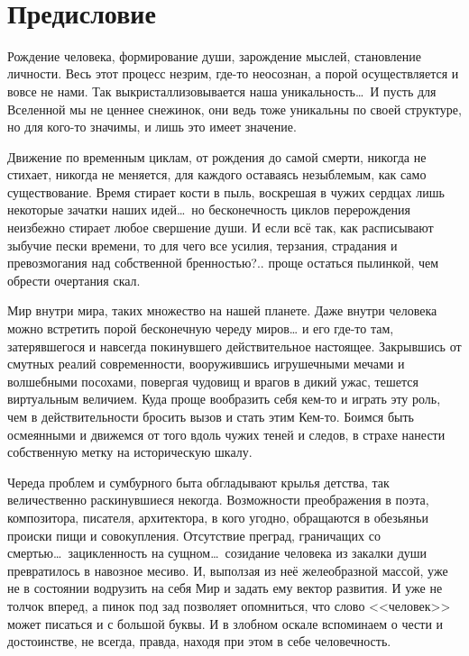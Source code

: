 \thispagestyle{empty}
~\\
\section*{Предисловие}

Рождение человека, формирование души, зарождение мыслей, становление личности. 
Весь этот процесс незрим, где-то неосознан, а порой осуществляется и вовсе не 
нами. Так выкристаллизовывается наша уникальность\dots\ И пусть для Вселенной 
мы не ценнее снежинок, они ведь тоже уникальны по своей структуре, но для 
кого-то значимы, и лишь это имеет значение.

Движение по временным циклам, от рождения до самой смерти, никогда не стихает, никогда не меняется, для каждого оставаясь незыблемым, как само существование. Время стирает кости в пыль, воскрешая в чужих сердцах лишь некоторые зачатки наших идей\dots\ но бесконечность циклов перерождения неизбежно стирает любое свершение души. И если всё так, как расписывают зыбучие пески времени, то для чего все усилия, терзания, страдания и превозмогания над собственной бренностью?.. проще остаться пылинкой, чем обрести очертания скал.

Мир внутри мира, таких множество на нашей планете. Даже внутри человека можно 
встретить порой бесконечную череду миров… и его где-то там, затерявшегося и 
навсегда покинувшего действительное настоящее. Закрывшись от смутных реалий 
современности, вооружившись игрушечными мечами и волшебными посохами, повергая 
чудовищ и врагов в дикий ужас, тешется виртуальным величием. Куда проще 
вообразить себя кем-то и играть эту роль, чем в действительности бросить вызов и 
стать этим Кем-то. Боимся быть осмеянными и движемся от того вдоль чужих теней и 
следов, в страхе нанести собственную метку на историческую шкалу.

Череда проблем и сумбурного быта обгладывают крылья детства, так величественно 
раскинувшиеся некогда. Возможности преображения в поэта, 
композитора, писателя, архитектора, в кого угодно, обращаются в обезьяньи 
происки пищи и совокупления. Отсутствие преград, граничащих со смертью\dots\ 
зацикленность на сущном\dots\ созидание человека из закалки души превратилось в 
навозное месиво. 
\newpage
\thispagestyle{empty}
\noindent И, выползая из неё желеобразной массой, уже не в состоянии 
водрузить на себя Мир и задать ему вектор развития. И уже не толчок вперед, а 
пинок под зад позволяет опомниться, что слово <<человек>> может писаться и с 
большой буквы. И в злобном оскале вспоминаем о чести и достоинстве, не всегда, 
правда, находя при этом в себе человечность. 

